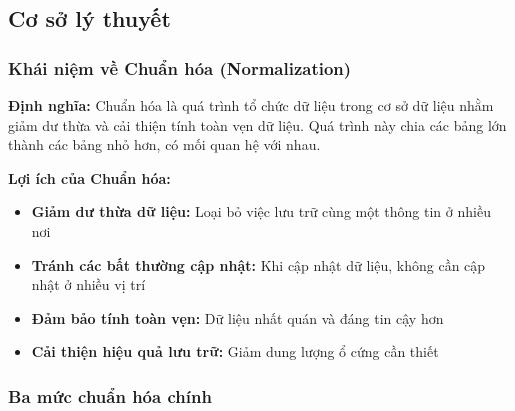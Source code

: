 \documentclass[12pt,a4paper]{article}
\begin{document}
\subsection{Cơ sở lý thuyết}

\subsubsection{Khái niệm về Chuẩn hóa (Normalization)}

\textbf{Định nghĩa:} Chuẩn hóa là quá trình tổ chức dữ liệu trong cơ sở dữ liệu nhằm giảm dư thừa và cải thiện tính toàn vẹn dữ liệu. Quá trình này chia các bảng lớn thành các bảng nhỏ hơn, có mối quan hệ với nhau.

\textbf{Lợi ích của Chuẩn hóa:}
\begin{itemize}
    \item \textbf{Giảm dư thừa dữ liệu:} Loại bỏ việc lưu trữ cùng một thông tin ở nhiều nơi
    \item \textbf{Tránh các bất thường cập nhật:} Khi cập nhật dữ liệu, không cần cập nhật ở nhiều vị trí
    \item \textbf{Đảm bảo tính toàn vẹn:} Dữ liệu nhất quán và đáng tin cậy hơn
    \item \textbf{Cải thiện hiệu quả lưu trữ:} Giảm dung lượng ổ cứng cần thiết
\end{itemize}

\subsubsection{Ba mức chuẩn hóa chính}
\end{document}
